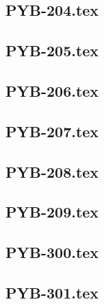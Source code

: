 \renewcommand{\xxexo}{PYB-204.tex} 
\subsection*{\xxexo} 
\graphicspath{{../../exos/python_bases/PYB-204/}}
 
 
\renewcommand{\xxexo}{PYB-205.tex} 
\subsection*{\xxexo} 
\graphicspath{{../../exos/python_bases/PYB-205/}}
 
 
\renewcommand{\xxexo}{PYB-206.tex} 
\subsection*{\xxexo} 
\graphicspath{{../../exos/python_bases/PYB-206/}}
 
 
\renewcommand{\xxexo}{PYB-207.tex} 
\subsection*{\xxexo} 
\graphicspath{{../../exos/python_bases/PYB-207/}}
 
 
\renewcommand{\xxexo}{PYB-208.tex} 
\subsection*{\xxexo} 
\graphicspath{{../../exos/python_bases/PYB-208/}}
 
 
\renewcommand{\xxexo}{PYB-209.tex} 
\subsection*{\xxexo} 
\graphicspath{{../../exos/python_bases/PYB-209/}}
 
 
\renewcommand{\xxexo}{PYB-300.tex} 
\subsection*{\xxexo} 
\graphicspath{{../../exos/python_bases/PYB-300/}}
 
 
\renewcommand{\xxexo}{PYB-301.tex} 
\subsection*{\xxexo} 
\graphicspath{{../../exos/python_bases/PYB-301/}}
 
 
